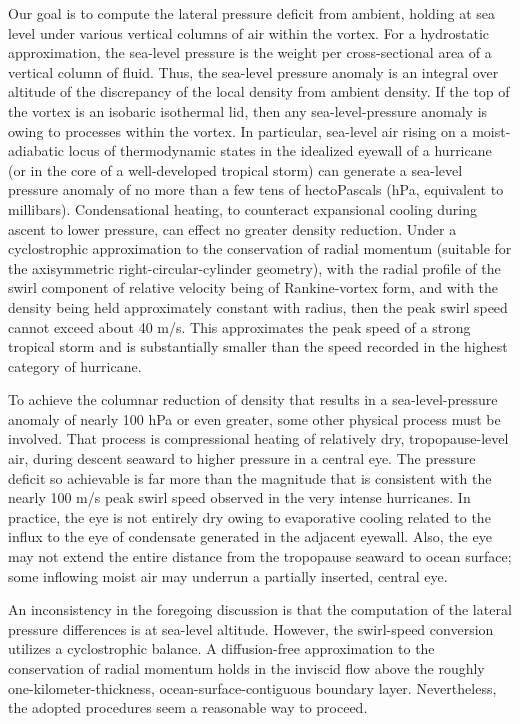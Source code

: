 \documentclass[preprint, prX]{revtex4}
\begin{document}
Our goal is to compute the lateral pressure deficit from ambient, holding at sea level under various vertical columns of air within the vortex. For a hydrostatic approximation, the sea-level pressure is the weight per cross-sectional area of a vertical column of fluid. Thus, the sea-level pressure anomaly is an integral over altitude of the discrepancy of the local density from ambient density. If the top of the vortex is an isobaric isothermal lid, then any sea-level-pressure anomaly is owing to processes within the vortex.
In particular, sea-level air rising on a moist-adiabatic locus of thermodynamic states in the idealized eyewall of a hurricane (or in the core of a well-developed tropical storm) can generate a sea-level pressure anomaly of no more than a few tens of hectoPascals (hPa, equivalent to millibars). Condensational heating, to counteract expansional cooling during ascent to lower pressure, can effect no greater density reduction. Under a cyclostrophic approximation to the conservation of radial momentum (suitable for the axisymmetric right-circular-cylinder geometry), with the radial profile of the swirl component of relative velocity being of Rankine-vortex form, and with the density being held approximately constant with radius, then the peak swirl speed cannot exceed about 40 m/s. This approximates the peak speed of a strong tropical storm and is substantially smaller than the speed recorded in the highest category of hurricane. 

To achieve the columnar reduction of density that results in a sea-level-pressure anomaly of nearly 100 hPa or even greater, some other physical process must be involved. That process is compressional heating of relatively dry, tropopause-level air, during descent seaward to higher pressure in a central eye.  The pressure deficit so achievable is far more than the magnitude that is consistent with the nearly 100 m/s peak swirl speed observed in the very intense hurricanes. In practice, the eye is not entirely dry owing to evaporative cooling related to the influx to the eye of condensate generated in the adjacent eyewall. Also, the eye may not extend the entire distance from the tropopause seaward to ocean surface; some inflowing moist air may underrun a partially inserted, central eye.

An inconsistency in the foregoing discussion is that the computation of the lateral pressure differences is at sea-level altitude. However, the swirl-speed conversion utilizes a cyclostrophic balance. A diffusion-free approximation to the conservation of radial momentum holds in the inviscid flow above the roughly one-kilometer-thickness, ocean-surface-contiguous boundary layer. Nevertheless, the adopted procedures seem a reasonable way to proceed. 
\end{document}
